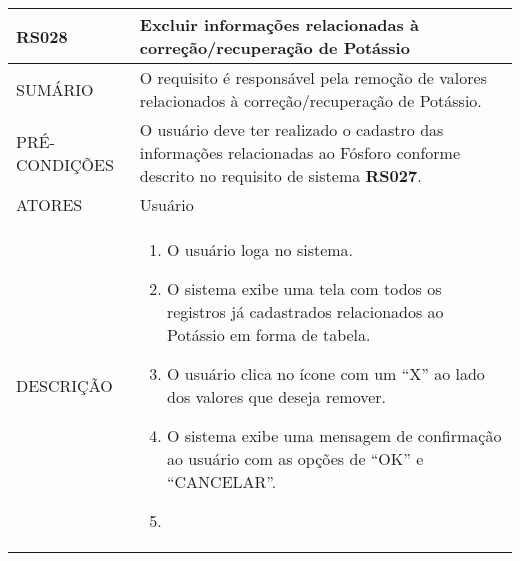 \begin{longtable}[c]{@{}|p{4cm}|p{9cm}|@{}}
\hline
\begin{minipage}[t]{0.47\columnwidth}
\textbf{RS028}
\end{minipage} & \begin{minipage}[t]{0.47\columnwidth}
Excluir informações relacionadas à correção/recuperação de Potássio
\end{minipage}
\\\hline
\begin{minipage}[t]{0.47\columnwidth}
SUMÁRIO
\end{minipage} & \begin{minipage}[t]{0.47\columnwidth}
O requisito é responsável pela remoção de valores relacionados à
correção/recuperação de Potássio.
\end{minipage}
\\\hline
\begin{minipage}[t]{0.47\columnwidth}
PRÉ-CONDIÇÕES
\end{minipage} & \begin{minipage}[t]{0.47\columnwidth}
O usuário deve ter realizado o cadastro das informações relacionadas ao
Fósforo conforme descrito no requisito de sistema \textbf{RS027}.
\end{minipage}
\\\hline
\begin{minipage}[t]{0.47\columnwidth}
ATORES
\end{minipage} & \begin{minipage}[t]{0.47\columnwidth}
Usuário
\end{minipage}
\\\hline
\begin{minipage}[t]{0.47\columnwidth}
DESCRIÇÃO
\end{minipage} & \begin{minipage}[t]{0.47\columnwidth}
\begin{enumerate}
\def\labelenumi{\arabic{enumi}.}
\itemsep1pt\parskip0pt\parsep0pt
\item
  O usuário loga no sistema.
\item
  O sistema exibe uma tela com todos os registros já cadastrados
  relacionados ao Potássio em forma de tabela.
\item
  O usuário clica no ícone com um ``X'' ao lado dos valores que deseja
  remover.
\item
  O sistema exibe uma mensagem de confirmação ao usuário com as opções
  de ``OK'' e ``CANCELAR''.
\item

\end{enumerate}
\end{minipage}
\end{longtable}
